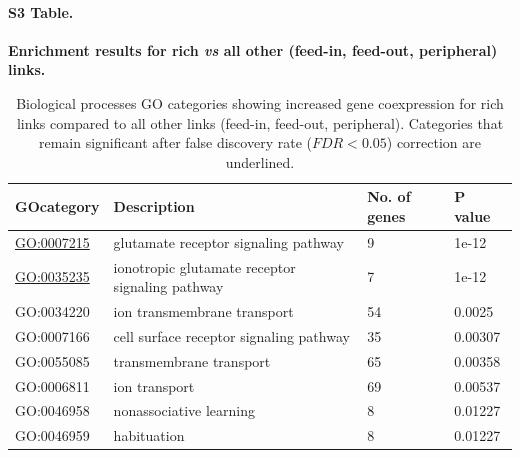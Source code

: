 \documentclass[10pt,letterpaper]{article}
\begin{document}
\paragraph*{S3 Table.}
{\bf Enrichment results for rich \textit{vs} all other (feed-in, feed-out, peripheral) links.}
\begin{table}[]
\centering
\caption{Biological processes GO categories showing increased gene coexpression for rich links compared to all other links (feed-in, feed-out, peripheral). 
Categories that remain significant after false discovery rate ($FDR < 0.05$) correction are underlined.}
\label{enrichmentRICH}
\begin{tabular}{llll}
\hline
\textbf{GOcategory} & \textbf{Description}                                                                                               & \textbf{No. of genes} & \textbf{P value} \\ \hline
\underline{GO:0007215}          & glutamate receptor signaling pathway                                                                               & 9                 & 1e-12         \\
\underline{GO:0035235}          & ionotropic glutamate receptor signaling pathway                                                                    & 7                 & 1e-12         \\
GO:0034220          & ion transmembrane transport                                                                                        & 54                & 0.0025        \\
GO:0007166          & cell surface receptor signaling pathway                                                                            & 35                & 0.00307       \\
GO:0055085          & transmembrane transport                                                                                            & 65                & 0.00358       \\
GO:0006811          & ion transport                                                                                                      & 69                & 0.00537       \\
GO:0046958          & nonassociative learning                                                                                            & 8                 & 0.01227       \\
GO:0046959          & habituation                                                                                                        & 8                 & 0.01227       \\

\end{tabular}
\end{table}
\end{document}
